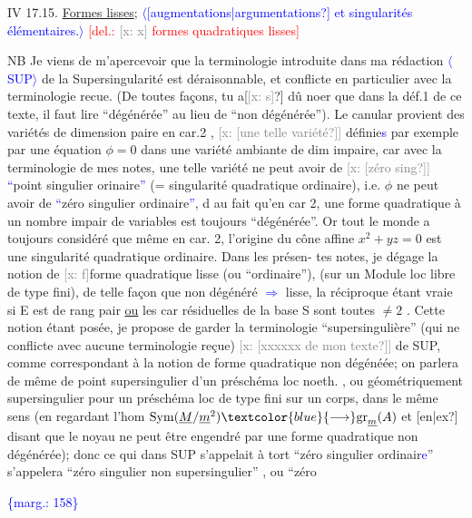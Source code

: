 \documentclass[11pt]{article}
\newcommand{\scanpage}[1]{\par\bigskip\noindent{\small\sffamily[scan #1]}\par}
\newcommand{\mspage}[1]{{\small\sffamily[p.\,#1]}}
\newcommand{\hand}[1]{\textcolor{blue}{#1}}
\let\over\relax
\newcommand{\over}[2]{\textcolor{gray}{#1}\textcolor{blue}{\ensuremath{^{\!\nearrow}}#2}}
\newcommand{\inserted}[2][]{\textcolor{blue}{$\langle$#2$\rangle$}}
\newcommand{\margin}[1]{\textcolor{blue}{\{\textsf{marg.:} #1\}}}
\newcommand{\deleted}[1]{\textcolor{red}{[\textsf{del.:} #1]}}
\newcommand{\xout}[1]{\textcolor{gray}{[\textsf{x:} #1]}}
\newcommand{\uline}[1]{\underline{#1}}
\newcommand{\unsure}[1]{[#1?]}
\begin{document}
IV 17.15. \uline{Formes lisses}; \inserted{\unsure{augmentations|argumentations} et singularités élémentaires.} \deleted{\xout{x} formes quadratiques lisses}

NB Je viens de m'apercevoir que la terminologie introduite dans
ma rédaction \inserted[typed]{SUP} de la Supersingularité est déraisonnable, et conflicte
en particulier avec la terminologie recue. (De toutes façons, tu a\unsure{\xout{s}} dû
no\over{t}{t}er que dans la déf.1 de ce texte, il faut lire ``dégénérée'' au lieu de
``non dégénérée''). Le canular provient des variétés de dimension paire
en car.2 , \xout{\unsure{une telle variété}} définie\hand{s} par exemple par une équation $\phi=0$
dans une variété ambiante de dim impaire, car avec la terminologie de mes
notes, une telle variété ne peut avoir de \xout{\unsure{zéro sing}} \hand{``}point singulier
or\over{d}{d}inaire\hand{''} (= singularité quadratique ordinaire), i.e. $\phi$ ne peut avoir
de \hand{``}zéro singulier ordinaire\hand{''}, d\over{u}{û} au fait qu'en car 2, une forme quadratique
à un nombre impair de variables est toujours ``dégénérée''. Or tout le
monde a toujours considéré que même en car. 2, l'origine du cône affine
$x^2 + yz = 0$ est une singularité quadratique ordinaire. Dans les présen-%
tes notes, je dégage la notion de \xout{f}forme quadratique lisse (ou ``ordinaire''),
(sur un Module loc libre de type fini), de telle façon que
non dégénéré \hand{$\Longrightarrow$} lisse, la réciproque étant vraie si E est de rang pair
\uline{ou} les car résiduelles de la base S sont toutes $\neq 2$ . Cette notion étant
posée, je propose de garder la terminologie ``supersingulière'' (qui ne
conflicte avec aucune terminologie reçue) \xout{\unsure{xxxxxx de mon texte}} de SUP,
comme correspondant à la notion de forme quadratique non dégéné\over{f}{r}ée; on
parlera de même de point supersingulier d'un préschéma loc noeth. , ou
géométriquement supersingulier pour un préschéma loc de type fini sur un
corps, dans le même sens (en regardant l'hom $\mathrm{Sym}(\underline{M}/\underline{m}^2) \hand{\longrightarrow} \mathrm{gr}_{\underline{m}}(A)$ et
\unsure{en|ex} disant que le noyau ne peut être engendré par une forme quadratique
non dégénérée); donc ce qui dans SUP s'appelait à tort ``zéro singulier
ordinair\hand{e}'' s'appelera ``zéro singulier non supersingulier'' , ou ``zéro

\margin{158}

\clearpage
\scanpage{25/159}
\mspage{\hand{2}}
\end{document}
